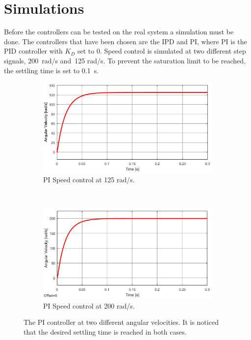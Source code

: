 \section{Simulations}
Before the controllers can be tested on the real system a simulation must be done. The controllers that have been chosen are the IPD and PI, where PI is the PID controller with $K_D$ set to 0. 
Speed control is simulated at two different step signals, 200~rad/s and~125 rad/s. 
To prevent the saturation limit to be reached, the settling time is set to 0.1~s.
\begin{figure}[h!]
	\centering
	\begin{subfigure}[b]{0.45\textwidth}
		\includegraphics[width=\textwidth]{graphics/PI_single125}
		\caption{PI Speed control at 125 rad/s.}
		\label{fig:pisingle125}
	\end{subfigure}
	~ %
	\begin{subfigure}[b]{0.45\textwidth}
		\includegraphics[width=\textwidth]{graphics/PI_single200}
		\caption{PI Speed control at 200 rad/s.}
		\label{fig:pisingle200}
	\end{subfigure}
	\caption{The PI controller at two different angular velocities. It is noticed that the desired settling time is reached in both cases.}\label{fig:pisingle}
\end{figure}


